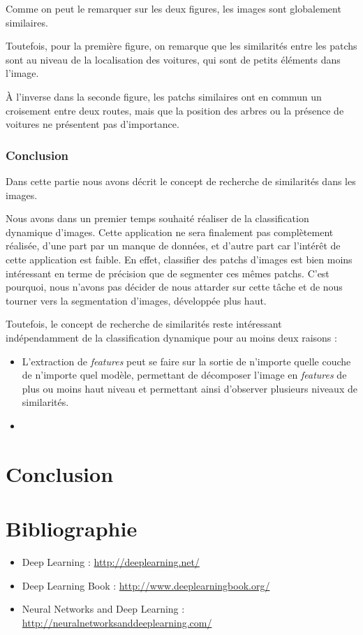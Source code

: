 \documentclass[a4paper, 11pt]{report}
\begin{document}
Comme on peut le remarquer sur les deux figures, les images sont globalement similaires.

Toutefois, pour la première figure, on remarque que les similarités entre les patchs sont au niveau de la localisation des voitures, qui sont de petits éléments dans l'image.

À l'inverse dans la seconde figure, les patchs similaires ont en commun un croisement entre deux routes, mais que la position des arbres ou la présence de voitures ne présentent pas d'importance.
\subsection{Conclusion}
Dans cette partie nous avons décrit le concept de recherche de similarités dans les images.

Nous avons dans un premier temps souhaité réaliser de la classification dynamique d'images.
Cette application ne sera finalement pas complètement réalisée, d'une part par un manque de données, et d'autre part car l'intérêt de cette application est faible.
En effet, classifier des patchs d'images est bien moins intéressant en terme de précision que de segmenter ces mêmes patchs.
C'est pourquoi, nous n'avons pas décider de nous attarder sur cette tâche et de nous tourner vers la segmentation d'images, développée plus haut.

Toutefois, le concept de recherche de similarités reste intéressant indépendamment de la classification dynamique pour au moins deux raisons :
\begin{itemize}
	\item L'extraction de \emph{features} peut se faire sur la sortie de n'importe quelle couche de n'importe quel modèle, permettant de décomposer l'image en \emph{features} de plus ou moins haut niveau et permettant ainsi d'observer plusieurs niveaux de similarités.
	\item 
\end{itemize}
\chapter{Conclusion}
\chapter*{Bibliographie}
\begin{itemize}
	\item Deep Learning : \url{http://deeplearning.net/}
	\item Deep Learning Book : \url{http://www.deeplearningbook.org/}
	\item Neural Networks and Deep Learning : \url{http://neuralnetworksanddeeplearning.com/}
\end{itemize}
\end{document}
